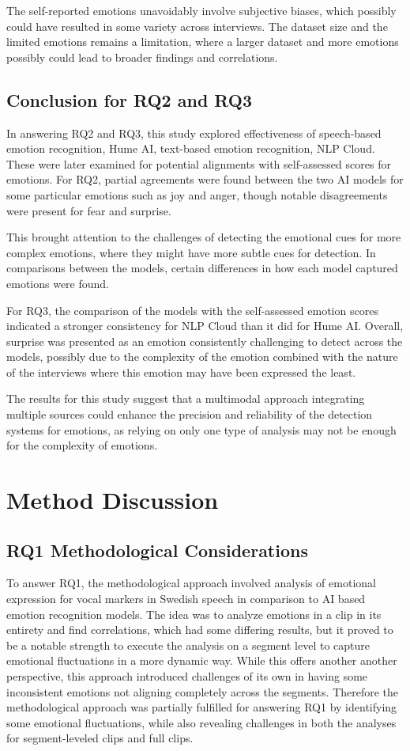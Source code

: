The self-reported emotions unavoidably involve subjective biases, which possibly could have resulted in some variety across interviews. 
The dataset size and the limited emotions remains a limitation, where a larger dataset and more emotions possibly could lead to broader findings and correlations.

\subsection{Conclusion for RQ2 and RQ3}
In answering RQ2 and RQ3, this study explored effectiveness of speech-based emotion recognition, Hume AI, text-based emotion recognition, NLP Cloud. These were later examined for potential alignments with self-assessed scores for emotions.
For RQ2, partial agreements were found between the two AI models for some particular emotions such as joy and anger, though notable disagreements were present for fear and surprise. 

This brought attention to the challenges of detecting the emotional cues for more complex emotions, where they might have more subtle cues for detection.
In comparisons between the models, certain differences in how each model captured emotions were found.

For RQ3, the comparison of the models with the self-assessed emotion scores indicated a stronger consistency for NLP Cloud than it did for Hume AI.
Overall, surprise was presented as an emotion consistently challenging to detect across the models, possibly due to the complexity of the emotion combined with the nature of the interviews where this emotion may have been expressed the least.

The results for this study suggest that a multimodal approach integrating multiple sources could enhance the precision and reliability of the detection systems for emotions, as relying on only one type of analysis may not be enough for the complexity of emotions.

\section{Method Discussion}
\subsection{RQ1 Methodological Considerations}
To answer RQ1, the methodological approach involved analysis of emotional expression for vocal markers in Swedish speech in comparison to AI based emotion recognition models. The idea was to analyze emotions in a clip in its entirety and find correlations, which had some differing results, but it proved to be a notable strength to execute the analysis on a segment level to capture emotional fluctuations in a more dynamic way. While this offers another another perspective, this approach introduced challenges of its own in having some inconsistent emotions not aligning completely across the segments. Therefore the methodological approach was partially fulfilled for answering RQ1 by identifying some emotional fluctuations, while also revealing challenges in both the analyses for segment-leveled clips and full clips.

